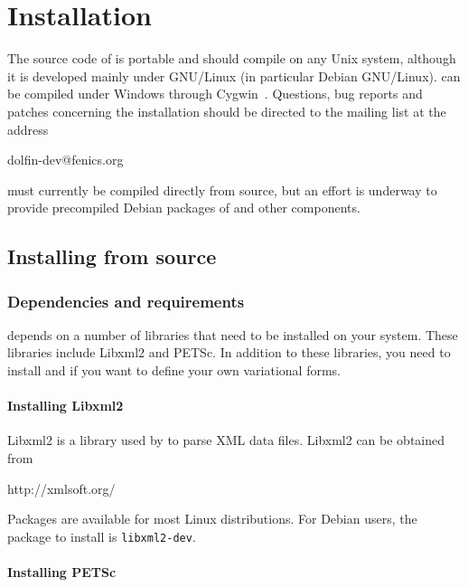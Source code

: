 \chapter{Installation}
\label{app:installation}

The source code of \dolfin{} is portable and should compile on any
Unix system, although it is developed mainly under GNU/Linux (in 
particular Debian GNU/Linux). \dolfin{} can be compiled under Windows
through Cygwin~\cite{www:Cygwin}. Questions, bug reports and patches
concerning the installation should be directed to the \dolfin{} mailing 
list at the address
\begin{code}
  dolfin-dev@fenics.org
\end{code}

\dolfin{} must currently be compiled directly from source, but an effort
is underway to provide precompiled Debian packages of \dolfin{} and
other \fenics{} components.

\section{Installing from source}

\subsection{Dependencies and requirements}

\dolfin{} depends on a number of libraries that need to be installed on your
system. These libraries include Libxml2 and PETSc. In addition to these 
libraries, you need to install \fiat{} and \ffc{} if you want to define your 
own variational forms.

\subsubsection{Installing Libxml2}

Libxml2 is a library used by \dolfin{} to parse XML data files. Libxml2 can be
obtained from
\begin{code}
  http://xmlsoft.org/
\end{code}
Packages are available for most Linux distributions. For Debian users, the 
package to install is \texttt{libxml2-dev}.

\subsubsection{Installing PETSc}

